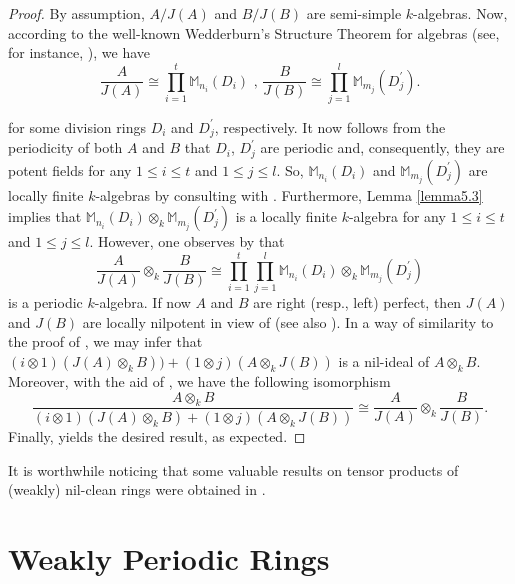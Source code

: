 \documentclass[12pt]{amsart}
\theoremstyle{definition}
\theoremstyle{remark}
\numberwithin{equation}{section}
\begin{document}
\begin{proof}
By assumption, $A/J(A)$ and $B/J(B)$ are semi-simple $k$-algebras. Now, according to the well-known Wedderburn's Structure Theorem for algebras (see, for instance, \cite[Theorem 3.5]{pierce1982}), we have
\[\frac{A}{J(A)} \cong \prod_{i=1}^{t} \mathbb{M}_{n_i}(D_i) \text{  ,  } \frac{B}{J(B)} \cong \prod_{j=1}^l \mathbb{M}_{m_j}(D^{'}_j).\]

\noindent for some division rings $D_i$ and $D^{'}_j$, respectively. It now follows from the periodicity of both $A$ and $B$ that $D_i$, $D^{'}_j$ are periodic and, consequently, they are potent fields for any $1 \leq i \leq t$ and $1 \leq j \leq l$. So, $\mathbb{M}_{n_i}(D_i)$ and $\mathbb{M}_{m_j}(D^{'}_j)$ are locally finite $k$-algebras by consulting with \cite[Corollary 2.3]{HKL}. Furthermore, Lemma \ref{lemma5.3} implies that $\mathbb{M}_{n_i}(D_i) \otimes_k \mathbb{M}_{m_j}(D^{'}_j)$ is a locally finite $k$-algebra for any $1 \leq i \leq t$ and $1 \leq j \leq l$. However, one observes by \cite[Lemma 2.12]{BCL} that
\[\frac{A}{J(A)} \otimes_k \frac{B}{J(B)} \cong \prod_{i=1}^t\prod_{j=1}^l \mathbb{M}_{n_i}(D_i) \otimes_k \mathbb{M}_{m_j}(D^{'}_j)\]
is a periodic $k$-algebra. If now $A$ and $B$ are right (resp., left) perfect, then $J(A)$ and $J(B)$ are locally nilpotent in view of \cite[Proposition 23.15]{L} (see also \cite[Exercise 23.1]{L}). In a way of similarity to the proof of \cite[Theorem 2.3]{BMA}, we may infer that $(i \otimes 1)(J(A) \otimes_k B))+(1 \otimes j)(A \otimes_k J(B))$ is a nil-ideal of $A \otimes_k B$. Moreover, with the aid of \cite[Proposition 2.2]{BMA}, we have the following isomorphism
\[\frac{A \otimes_k B}{(i \otimes 1)(J(A) \otimes_k B)+(1 \otimes j)(A \otimes_k J(B))} \cong \frac{A}{J(A)} \otimes_k \frac{B}{J(B)}.\]
Finally, \cite[Corollary 3.6]{BCL} yields the desired result, as expected.
\end{proof}

It is worthwhile noticing that some valuable results on tensor products of (weakly) nil-clean rings were obtained in \cite{S}.

\section{Weakly Periodic Rings}\label{SectionWeaklyPeriodicRings}

\medskip
\end{document}
